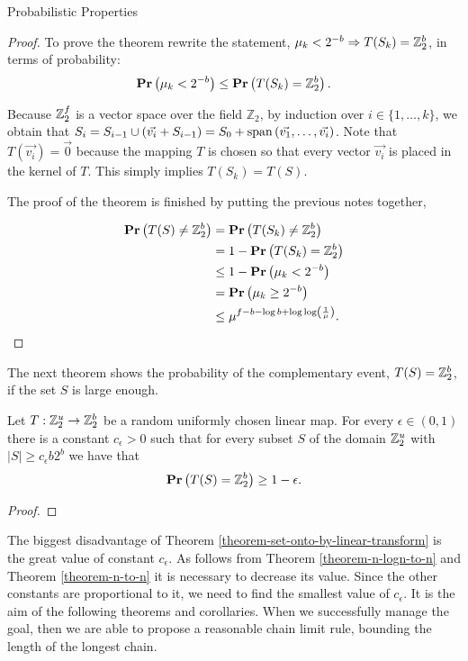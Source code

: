 \begin{section}{Probabilistic Properties}
\begin{proof}
To prove the theorem rewrite the statement, $\mu_k < 2 ^ {-b} \Rightarrow T(S_k) = \mathbb{Z}_{2}^{b}$, in terms of probability:
\[
	\mathbf{Pr}\left(\mu_k < 2^{-b}\right) \leq \mathbf{Pr}\left(T(S_k) = \mathbb{Z}_{2}^{b}\right) \text{.}
\]

Because $\mathbb{Z}_{2}^{f}$ is a vector space over the field $\mathbb{Z}_2$, by induction over $i \in \{ 1, \dots, k \}$, we obtain that $S_i = S_{i - 1} \cup (\vec{v_i} + S_{i - 1}) = S_0 + \mathrm{span}\left({\vec{v_1}, \dots, \vec{v_i}}\right)$. Note that $T(\vec{v_i}) = \vec{0}$ because the mapping $T$ is chosen so that every vector $\vec{v_i}$ is placed in the kernel of $T$. This simply implies $T(S_k) = T(S)$.

The proof of the theorem is finished by putting the previous notes together,

\[
\begin{split}
\mathbf{Pr}\left(T(S) \neq \mathbb{Z}_{2}^{b}\right) 
	& = \mathbf{Pr}\left(T(S_k) \neq \mathbb{Z}_{2}^{b}\right)  \\
	& = 1 - \mathbf{Pr}\left(T(S_k) = \mathbb{Z}_{2}^{b}\right) \\
	& \leq 1 - \mathbf{Pr}\left(\mu_k < 2 ^ {-b}\right) \\
	& = \mathbf{Pr}\left(\mu_k \geq 2 ^ {-b}\right) \\
	& \leq \mu ^ {f - b - \log b + \log \log \left(\frac{1}{\mu}\right)} \text{.}
\end{split}
\]
\end{proof}

The next theorem shows the probability of the complementary event, $T(S) = \mathbb{Z}_{2}^{b}$, if the set $S$ is large enough.
\begin{theorem}
\label{theorem-set-onto-by-linear-transform}
Let $T: \mathbb{Z}_{2}^{u} \rightarrow \mathbb{Z}_{2}^{b}$ be a random uniformly chosen linear map. For every $\epsilon \in (0, 1)$ there is a constant $c_\epsilon > 0$ such that for every subset $S$ of the domain $\mathbb{Z}_{2}^{u}$ with $|S| \geq c_\epsilon b 2 ^ b$ we have that
\[
	\mathbf{Pr}\left(T(S) = \mathbb{Z}_{2}^{b}\right) \geq 1 - \epsilon \text{.}
\]
\end{theorem}
\begin{proof}

\end{proof}

The biggest disadvantage of Theorem \ref{theorem-set-onto-by-linear-transform} is the great value of constant $c_{\epsilon}$. As follows from Theorem \ref{theorem-n-logn-to-n} and Theorem \ref{theorem-n-to-n} it is necessary to decrease its value. Since the other constants are proportional to it, we need to find the smallest value of $c_{\epsilon}$. It is the aim of the following theorems and corollaries. When we successfully manage the goal, then we are able to propose a reasonable chain limit rule, bounding the length of the longest chain.
\end{section}

